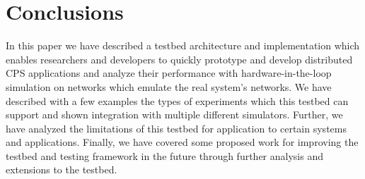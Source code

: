 \section{Conclusions}
\label{sec:Conclusions}
In this paper we have described a testbed architecture and implementation which enables researchers and developers to quickly prototype and develop distributed CPS applications and analyze their performance with hardware-in-the-loop simulation on networks which emulate the real system's networks.  We have described with a few examples the types of experiments which this testbed can support and shown integration with multiple different simulators.  Further, we have analyzed the limitations of this testbed for application to certain systems and applications.  Finally, we have covered some proposed work for improving the testbed and testing framework in the future through further analysis and extensions to the testbed.  